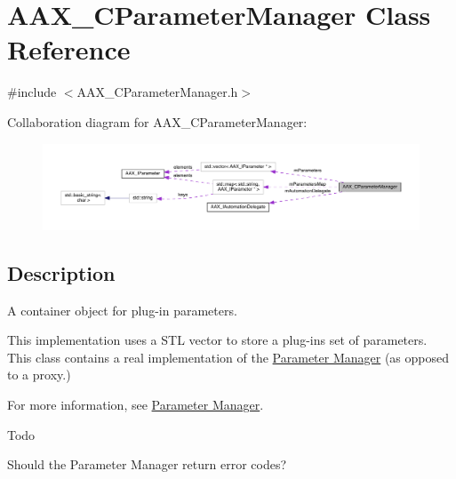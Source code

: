 \hypertarget{a00034}{}\section{A\+A\+X\+\_\+\+C\+Parameter\+Manager Class Reference}
\label{a00034}


{\ttfamily \#include $<$A\+A\+X\+\_\+\+C\+Parameter\+Manager.\+h$>$}



Collaboration diagram for A\+A\+X\+\_\+\+C\+Parameter\+Manager\+:
\nopagebreak
\begin{figure}[H]
\begin{center}
\leavevmode
\includegraphics[width=350pt]{a00450}
\end{center}
\end{figure}


\subsection{Description}
A container object for plug-\/in parameters. 

This implementation uses a S\+T\+L vector to store a plug-\/in\textquotesingle{}s set of parameters. This class contains a real implementation of the \hyperlink{a00344}{Parameter Manager} (as opposed to a proxy.)

For more information, see \hyperlink{a00344}{Parameter Manager}.

\begin{DoxyRefDesc}{Todo}
\item[\hyperlink{a00382__todo000018}{Todo}]Should the Parameter Manager return error codes?\end{DoxyRefDesc}
